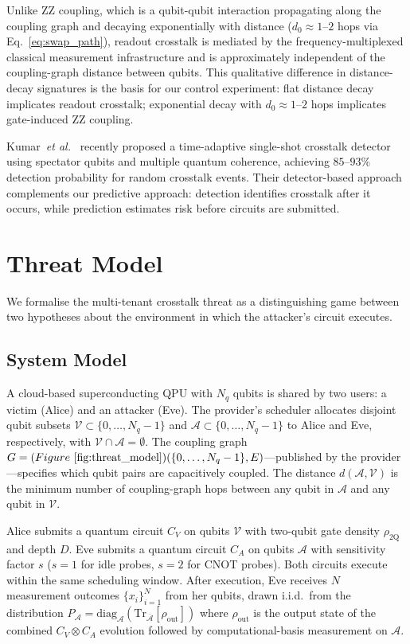 \documentclass[ASNA,twocolumn]{USG}
\begin{document}
Unlike ZZ coupling, which is a qubit-qubit interaction propagating along the coupling graph and decaying exponentially with distance ($d_0 \approx 1$--$2$ hops via Eq.~\ref{eq:swap_path}), readout crosstalk is mediated by the frequency-multiplexed classical measurement infrastructure and is approximately independent of the coupling-graph distance between qubits. This qualitative difference in distance-decay signatures is the basis for our control experiment: flat distance decay implicates readout crosstalk; exponential decay with $d_0 \approx 1$--$2$ hops implicates gate-induced ZZ coupling.

Kumar~\emph{et al.}~\cite{timeadaptive2025crosstalk} recently proposed a time-adaptive single-shot crosstalk detector using spectator qubits and multiple quantum coherence, achieving $85$--$93\%$ detection probability for random crosstalk events. Their detector-based approach complements our predictive approach: detection identifies crosstalk after it occurs, while prediction estimates risk before circuits are submitted.

\section{Threat Model}
\label{sec:threat}

We formalise the multi-tenant crosstalk threat as a distinguishing game between two hypotheses about the environment in which the attacker's circuit executes.

\subsection{System Model}

A cloud-based superconducting QPU with $N_q$ qubits is shared by two users: a victim (Alice) and an attacker (Eve). The provider's scheduler allocates disjoint qubit subsets $\mathcal{V} \subset \{0,\ldots,N_q-1\}$ and $\mathcal{A} \subset \{0,\ldots,N_q-1\}$ to Alice and Eve, respectively, with $\mathcal{V} \cap \mathcal{A} = \emptyset$. The coupling graph $G = (Figure~\ref{fig:threat_model}) (\{0,\ldots,N_q-1\}, E)$---published by the provider---specifies which qubit pairs are capacitively coupled. The distance $d(\mathcal{A}, \mathcal{V})$ is the minimum number of coupling-graph hops between any qubit in $\mathcal{A}$ and any qubit in $\mathcal{V}$.

Alice submits a quantum circuit $C_V$ on qubits $\mathcal{V}$ with two-qubit gate density $\rho_{\mathrm{2Q}}$ and depth $D$. Eve submits a quantum circuit $C_A$ on qubits $\mathcal{A}$ with sensitivity factor $s$ ($s=1$ for idle probes, $s=2$ for CNOT probes). Both circuits execute within the same scheduling window. After execution, Eve receives $N$ measurement outcomes $\{x_i\}_{i=1}^N$ from her qubits, drawn i.i.d.\ from the distribution $P_{\mathcal{A}} = \mathrm{diag}_{\mathcal{A}}(\mathrm{Tr}_{\overline{\mathcal{A}}}[\rho_{\mathrm{out}}])$ where $\rho_{\mathrm{out}}$ is the output state of the combined $C_V \otimes C_A$ evolution followed by computational-basis measurement on $\mathcal{A}$.
\end{document}
